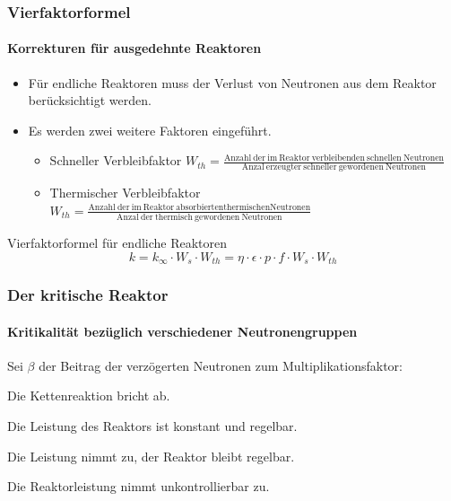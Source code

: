 \documentclass{beamer}[9pt]
\begin{document}
\begin{frame}
\frametitle{Vierfaktorformel}
\framesubtitle{Korrekturen für ausgedehnte Reaktoren}
\begin{itemize}
\item Für endliche Reaktoren muss der Verlust von Neutronen aus dem Reaktor berücksichtigt werden.
\item Es werden zwei weitere Faktoren eingeführt.
\begin{itemize}
\item Schneller Verbleibfaktor
\vspace{0.5em}
$
W_{th} = \frac{\mathrm{Anzahl\ der\ im\ Reaktor\ verbleibenden\ schnellen\ Neutronen}}{\mathrm{Anzal\ erzeugter\ schneller\ gewordenen\ Neutronen}}
$
\vspace{1em}
\item Thermischer Verbleibfaktor
$
W_{th} = \frac{\mathrm{Anzahl\ der\ im\ Reaktor\ absorbierten thermischen Neutronen}}{\mathrm{Anzal\ der\ thermisch\ gewordenen\ Neutronen}}
$
\end{itemize}
\end{itemize}
\begin{block}{Vierfaktorformel für endliche Reaktoren}
\[k
 = k_{\infty} \cdot W_s \cdot W_{th} = \eta\cdot\epsilon\cdot p\cdot f  \cdot W_s \cdot W_{th} 
\]
\end{block}
\end{frame}
\begin{frame}
\frametitle{Der kritische Reaktor}
\framesubtitle{Kritikalität bezüglich verschiedener Neutronengruppen}
Sei $\beta$ der Beitrag der verzögerten Neutronen zum Multiplikationsfaktor:
\begin{description}
\item[unterkritisch$(k < 0)$:] Die Kettenreaktion bricht ab. 
\item[verzögert kritisch$(k = 1)$:] Die Leistung des Reaktors ist konstant und regelbar.
\item[verzögert überkritisch$(1 < k < 1 + \beta)$:] Die Leistung nimmt zu, der Reaktor bleibt regelbar.
\item[prompt überkritisch$(k > 1+\beta)$:] Die Reaktorleistung nimmt unkontrollierbar zu.
\end{description}
\end{frame}
\end{document}
